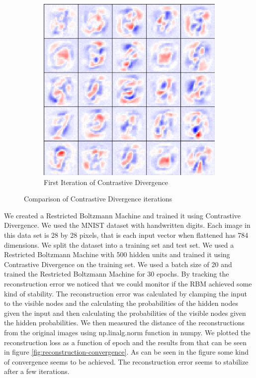 \documentclass[a4paper]{article}
\begin{document}
\begin{figure}[htb]
\begin{subfigure}[b]{0.45\textwidth}
        \includegraphics[width=\textwidth]{Labs/Lab 4/Steinar/rf.iter000001.png}
        \caption{First Iteration of Contrastive Divergence}
        \label{fig:Lab4-iter2}
    \end{subfigure}
    \caption{Comparison of Contrastive Divergence iterations}
    \label{fig:Lab4-comparison}
\end{figure}

We created a Restricted Boltzmann Machine and trained it using Contrastive Divergence. We used the MNIST dataset with handwritten digits. Each image in this data set is 28 by 28 pixels, that is each input vector when flattened has 784 dimensions. We split the dataset into a training set and test set. We used a Restricted Boltzmann Machine with 500 hidden units and trained it using Contrastive Divergence on the training set. We used a batch size of 20 and trained the Restricted Boltzmann Machine for 30 epochs. By tracking the reconstruction error we noticed that we could monitor if the RBM achieved some kind of stability. The reconstruction error was calculated by clamping the input to the visible nodes and the calculating the probabilities of the hidden nodes given the input and then calculating the probabilities of the visible nodes given the hidden probabilities. We then measured the distance of the reconstructions from the original images using np.linalg.norm function in numpy. We plotted the reconstruction loss as a function of epoch and the results from that can be seen in figure \ref{fig:reconstruction-convergence}. As can be seen in the figure some kind of convergence seems to be achieved. The reconstruction error seems to stabilize after a few iterations.
\end{document}
